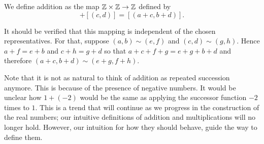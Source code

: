 \documentclass[../main.tex]{subfiles}
\begin{document}
\begin{definition}
    We define addition as the map $\mathbb{Z}\times\mathbb{Z}\to\mathbb{Z}$ defined by
    \begin{equation*}
        [(a,b)]+[(c,d)]=[(a+c,b+d)].
    \end{equation*}
\end{definition}
It should be verified that this mapping is independent of the chosen representatives. For that, suppose $(a,b)\sim(e,f)$ and $(c,d)\sim(g,h)$. Hence $a+f=e+b$ and $c+h=g+d$ so that $a+c+f+g=e+g+b+d$ and therefore $(a+c,b+d)\sim(e+g,f+h)$.

Note that it is not as natural to think of addition as repeated succession anymore. This is because of the presence of negative numbers. It would be unclear how $1+(-2)$ would be the same as applying the successor function $-2$ times to $1$. This is a trend that will continue as we progress in the construction of the real numbers; our intuitive definitions of addition and multiplications will no longer hold. However, our intuition for how they should behave, guide the way to define them.
\end{document}
